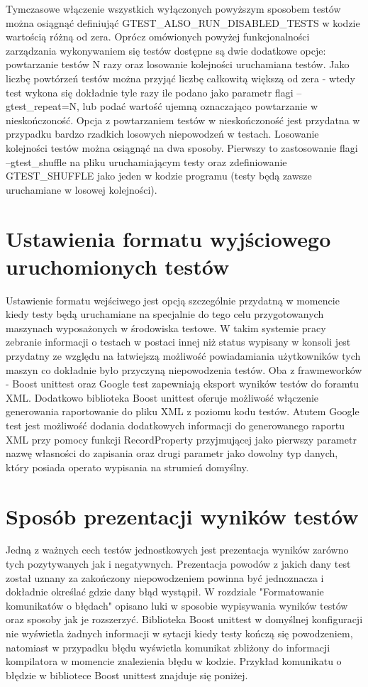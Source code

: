 \documentclass[12pt,a4paper,notitlepage]{report}
\begin{document}
Tymczasowe włączenie wszystkich wyłączonych powyższym sposobem testów można osiągnąć definiująć GTEST_ALSO_RUN_DISABLED_TESTS w kodzie wartością różną od zera.
Oprócz omówionych powyżej funkcjonalności zarządzania wykonywaniem się testów dostępne są dwie dodatkowe opcje: powtarzanie testów N razy oraz losowanie kolejności uruchamiana testów.
Jako liczbę powtórzeń testów można przyjąć liczbę całkowitą większą od zera - wtedy test wykona się dokładnie tyle razy ile podano jako parametr flagi --gtest_repeat=N, lub podać wartość ujemną oznaczająco powtarzanie w nieskończoność. Opcja z powtarzaniem testów w nieskończoność jest przydatna w przypadku bardzo rzadkich losowych niepowodzeń w testach.
Losowanie kolejności testów można osiągnąć na dwa sposoby. Pierwszy to zastosowanie flagi --gtest_shuffle na pliku uruchamiającym testy oraz zdefiniowanie GTEST_SHUFFLE jako jeden w kodzie programu (testy będą zawsze uruchamiane w losowej kolejności).

\chapter{Ustawienia formatu wyjściowego uruchomionych testów}

Ustawienie formatu wejściwego jest opcją szczególnie przydatną w momencie kiedy testy będą uruchamiane na specjalnie do tego celu przygotowanych maszynach wyposażonych w środowiska testowe. W takim systemie pracy zebranie informacji o testach w postaci innej niż status wypisany w konsoli jest przydatny ze względu na łatwiejszą możliwość powiadamiania użytkowników tych maszyn co dokładnie było przyczyną niepowodzenia testów.
Oba z frawmeworków - Boost unittest oraz Google test zapewniają eksport wyników testów do foramtu XML. Dodatkowo biblioteka Boost unittest oferuje możliwość włączenie generowania raportowanie do pliku XML z poziomu kodu testów. Atutem Google test jest możliwość dodania dodatkowych informacji do generowanego raportu XML przy pomocy funkcji 	RecordProperty przyjmującej jako pierwszy parametr nazwę własności do zapisania oraz drugi parametr jako dowolny typ danych, który posiada operato wypisania na strumień domyślny.

\chapter{Sposób prezentacji wyników testów}

Jedną z ważnych cech testów jednostkowych jest prezentacja wyników zarówno tych pozytywanych jak i negatywnych. Prezentacja powodów z jakich dany test został uznany za zakończony niepowodzeniem powinna być jednoznacza i dokładnie określać gdzie dany błąd wystąpił.
W rozdziale "Formatowanie komunikatów o błędach" opisano luki w sposobie wypisywania wyników testów oraz sposoby jak je rozszerzyć.
Biblioteka Boost unittest w domyślnej konfiguracji nie wyświetla żadnych informacji w sytacji kiedy testy kończą się powodzeniem, natomiast w przypadku błędu wyświetla komunikat zbliżony do informacji kompilatora w momencie znalezienia błędu w kodzie.
Przykład komunikatu o błędzie w bibliotece Boost unittest znajduje się poniżej.
\end{document}
